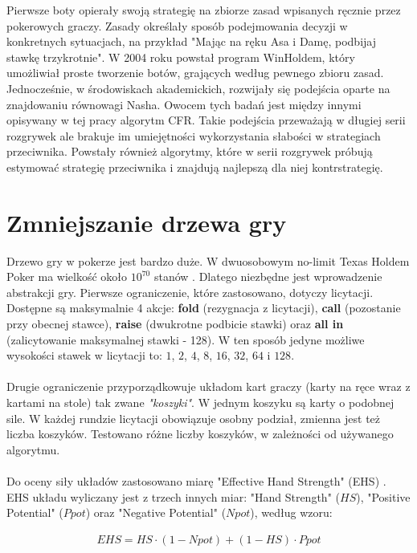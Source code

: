 \documentclass[licencjacka]{pracamgr}
\begin{document}
Pierwsze boty opierały swoją strategię na zbiorze zasad wpisanych ręcznie przez pokerowych graczy. Zasady określały
sposób podejmowania decyzji w konkretnych sytuacjach, na przykład "Mając na ręku Asa i Damę, podbijaj stawkę trzykrotnie".
W 2004 roku powstał program WinHoldem, który umożliwiał proste tworzenie botów, grających według pewnego zbioru zasad.
Jednocześnie, w środowiskach akademickich, rozwijały się podejścia oparte na znajdowaniu równowagi Nasha. Owocem tych
badań jest między innymi opisywany w tej pracy algorytm CFR. Takie podejścia przeważają w długiej serii rozgrywek ale
brakuje im umiejętności wykorzystania słabości w strategiach przeciwnika. Powstały również algorytmy, które w serii
rozgrywek próbują estymować strategię przeciwnika i znajdują najlepszą dla niej kontrstrategię. \cite{exploit}

\section{Zmniejszanie drzewa gry}

Drzewo gry w pokerze jest bardzo duże. W dwuosobowym no-limit Texas Holdem Poker ma wielkość
około $10^{70}$ stanów \cite{monte-carlo}. Dlatego niezbędne jest wprowadzenie abstrakcji gry.
Pierwsze ograniczenie, które zastosowano, dotyczy licytacji. Dostępne są maksymalnie 4 akcje:
\textbf{fold} (rezygnacja z licytacji), \textbf{call} (pozostanie przy obecnej stawce), \textbf{raise} (dwukrotne podbicie stawki) oraz
\textbf{all in} (zalicytowanie maksymalnej stawki - 128). W ten sposób jedyne możliwe wysokości stawek w licytacji to: $1$, $2$,
$4$, $8$, $16$, $32$, $64$ i $128$. \\\\
\noindent
Drugie ograniczenie przyporządkowuje układom kart graczy (karty na ręce wraz z kartami na stole) tak zwane \emph{"koszyki"}. \cite[sekcja 4.4]{buckets}
W jednym koszyku są karty o podobnej sile. W każdej rundzie licytacji obowiązuje osobny podział, zmienna
jest też liczba koszyków. Testowano różne liczby koszyków, w zależności od używanego algorytmu. \\\\
\noindent
Do oceny siły układów zastosowano miarę "Effective Hand Strength" (EHS) \cite{ehs}. EHS układu wyliczany
jest z trzech innych miar: "Hand Strength" ($HS$), "Positive Potential" ($Ppot$) oraz "Negative Potential" ($Npot$), według
wzoru:

\begin{align*}
EHS = HS \cdot (1 - Npot) + (1 - HS) \cdot Ppot
\end{align*}
\end{document}
